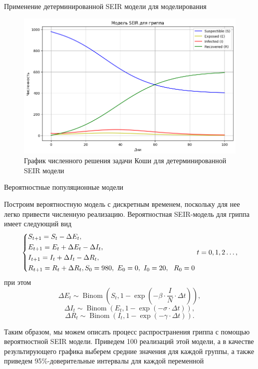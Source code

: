 \documentclass[notheorems]{beamer}
\newcommand{\Binom}{\operatorname{Binom}}
\begin{document}
\begin{frame}
	{Применение детерминированной SEIR модели для моделирования}
\begin{figure}
	\centering
	\includegraphics[scale=0.4]{images/graph01}
	\caption{График численного решения задачи Коши для детерминированной SEIR модели}
	\label{fig:graph01}
\end{figure}
\end{frame}


\begin{frame}
	{Вероятностные популяционные модели}
	\small{Построим вероятностную модель с дискретным временем, поскольку для нее легко привести численную реализацию. Вероятностная SEIR-модель для гриппа имеет следующий вид
	\begin{equation}
		\begin{dcases}
			S_{t+1} = S_t - \Delta E_t,\\
			E_{t+1} = E_t +\Delta E_t - \Delta I_t,\\
			I_{t+1} = I_t + \Delta I_t - \Delta R_t,\\
			R_{t+1} = R_t + \Delta R_t,
			S_0 = 980,\ E_0 = 0,\ I_0 = 20,\ \ R_0 = 0
		\end{dcases}
		t = 0,1,2\ldots,
	\end{equation}
	при этом
	$$\Delta E_t \sim \Binom\left(S_t, 
	1 - \exp\left(-\beta\cdot  \frac{I}{N} \cdot \Delta t\right)\right),$$
	$$\Delta I_t \sim \Binom\left(E_t, 1 - \exp\left(-\sigma \cdot \Delta t\right)\right),$$
	$$\Delta R_t \sim \Binom\left(I_t, 1 - \exp\left(-\gamma \cdot \Delta t\right)\right).$$
	
	Таким образом, мы можем описать процесс распространения гриппа с помощью вероятностной SEIR модели. Приведем 100 реализаций этой модели, а в качестве результирующего графика выберем средние значения для каждой группы, а также приведем 95\%-доверительные интервалы для каждой переменной}
\end{frame}
\end{document}
